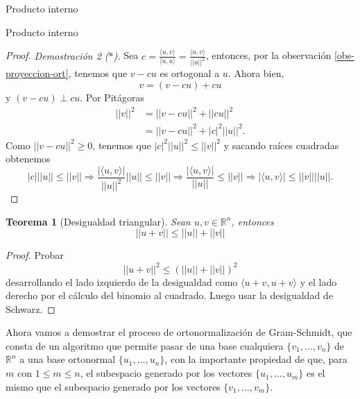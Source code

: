 \documentclass[a4paper,12pt,twoside,spanish,reqno]{amsbook}
\numberwithin{equation}{section}
\newtheorem{teorema}{Teorema}[section]
\theoremstyle{definition}
\theoremstyle{remark}
\newcommand{\la}{\langle}
\newcommand{\ra}{\rangle}
\newcommand{\R}{\mathbb R}
\begin{document}
\begin{chapter}{Producto interno}
\begin{section}{Producto interno}
\begin{proof}
            
        \textit{Demostración 2 ($*$).}
            Sea $c = \displaystyle\frac{\la u,v\ra}{\la u,u\ra} = \frac{\la u,v\ra}{||u||^2}$, entonces, por la observación \ref{obs-proyeccion-ort}, tenemos que  $ v-cu$ es ortogonal a $u$. Ahora bien, 
            \begin{equation*}
                v = (v - cu) + cu   
            \end{equation*}
            y  $(v - cu) \perp cu$. Por Pitágoras
            \begin{align*}
            ||v||^2 &= ||v-cu||^2 +||cu||^2  \\
            &=||v-cu||^2 +|c|^2||u||^2.
            \end{align*}
            Como $||v-cu||^2 \ge 0$, tenemos que $|c|^2||u||^2 \le 	||v||^2$ y sacando raíces cuadradas obtenemos
            $$
            |c|||u|| \le ||v|| \Rightarrow \frac{|\la u,v\ra|}{||u||^2}||u|| \le ||v|| \Rightarrow \frac{|\la u,v\ra|}{||u||}\le ||v|| \Rightarrow |\la u,v\ra|\le ||v||||u||.
            $$
        \end{proof}
        
        \begin{teorema}[Desigualdad triangular] Sean $u, v\in \R^n$, entonces 
            $$||u + v|| \le ||u|| + ||v||	$$
        \end{teorema}
        \begin{proof}
            Probar 
            $$
            ||u + v||^2 \le (||u|| + ||v||)^2
            $$
            desarrollando  el lado izquierdo de la desigualdad  como $\la u+v, u+v \ra$ y el lado derecho por el cálculo del binomio al cuadrado. Luego usar la desigualdad de Schwarz.
        \end{proof}
        
        
        \medskip
        
        Ahora vamos a demostrar el proceso de ortonormalización de Gram-Schmidt, que consta de  un algoritmo que permite pasar de una base cualquiera $\{v_1,\ldots, v_n\}$ de $\R^n$ a una base ortonormal $\{u_1,\ldots, u_n\}$, con la importante propiedad de que, para $m$ con  $1 \le m \le n$, el subespacio generado por los vectores $\{u_1,\ldots, u_m\}$ es el mismo que el subespacio generado por los vectores $\{v_1,\ldots, v_m\}$.
        
    
        
        \medskip 
        

\end{section}
\end{chapter}
\end{document}
